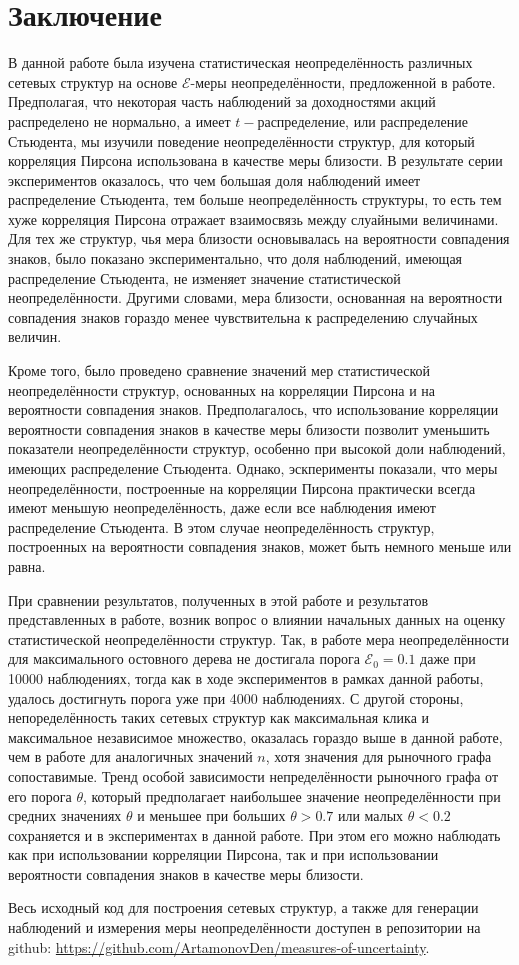 \section{Заключение}

В данной работе была изучена статистическая неопределённость различных сетевых структур на основе $\mathcal{E}$-меры неопределённости, предложенной в работе\cite{measures}. Предполагая, что некоторая часть наблюдений за доходностями акций распределено не нормально, а имеет $t-$распределение, или распределение Стьюдента, мы изучили поведение неопределённости структур, для который корреляция Пирсона использована в качестве меры близости. В результате серии экспериментов оказалось, что чем большая доля наблюдений имеет распределение Стьюдента, тем больше неопределённость структуры, то есть тем хуже корреляция Пирсона отражает взаимосвязь между слуайными величинами. Для тех же структур, чья мера близости основывалась на вероятности совпадения знаков, было показано экспериментально, что доля наблюдений, имеющая распределение Стьюдента, не изменяет значение статистической неопределённости. Другими словами, мера близости, основанная на вероятности совпадения знаков гораздо менее чувствительна к распределению случайных величин.

Кроме того, было проведено сравнение значений мер статистической неопределённости структур, основанных на корреляции Пирсона и на вероятности совпадения знаков. Предполагалось, что использование корреляции вероятности совпадения знаков в качестве меры близости позволит уменьшить показатели неопределённости структур, особенно при высокой доли наблюдений, имеющих распределение Стьюдента. Однако, эскперименты показали, что меры неопределённости, построенные на корреляции Пирсона практически всегда имеют меньшую неопределённость, даже если все наблюдения имеют распределение Стьюдента. В этом случае неопределённость структур, построенных на вероятности совпадения знаков, может быть немного меньше или равна.

При сравнении результатов, полученных в этой работе и результатов представленных в работе\cite{measures}, возник вопрос о влиянии начальных данных на оценку статистической неопределённости структур. Так, в работе\cite{measures} мера неопределённости для максимального остовного дерева не достигала порога $\mathcal{E}_0=0.1$ даже при 10000 наблюдениях, тогда как в ходе экспериментов в рамках данной работы, удалось достигнуть порога уже при 4000 наблюдениях.  С другой стороны, непоределённость таких сетевых структур как максимальная клика и максимальное независимое множество, оказалась гораздо выше  в данной работе, чем в работе \cite{measures} для аналогичных значений $n$, хотя значения для рыночного графа сопоставимые. Тренд особой зависимости непределённости рыночного графа от его порога $\theta$, который предполагает наибольшее значение неопределённости при средних значениях $\theta$ и меньшее при больших $\theta>0.7$ или малых $\theta<0.2$ сохраняется и в экспериментах в данной работе. При этом его можно наблюдать как при использовании корреляции Пирсона, так и при использовании вероятности совпадения знаков в качестве меры близости.

Весь исходный код для построения сетевых структур, а также для генерации наблюдений и измерения меры неопределённости доступен в репозитории на github: \url{https://github.com/ArtamonovDen/measures-of-uncertainty}.